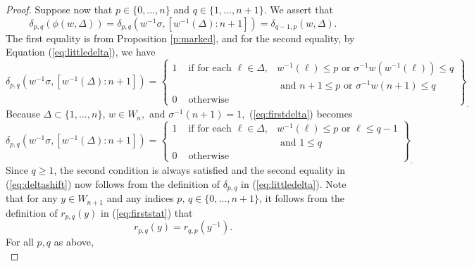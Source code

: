 \documentclass[10pt,a4paper]{amsart}
\newcommand{\Wn}{{W}_n}
\newcommand{\cW}{{ W}}
\begin{document}
\begin{proof}
Suppose now that $p\in\{0,\dots, n\}$ and $q\in\{1,\dots, n+1\}.$  We assert that 
\begin{equation} \label{eq:deltashift}
\delta_{p,q}(\phi(w,\Delta))=\delta_{p,q}(w^{-1}\sigma, [w^{-1}(\Delta): n+1])=\delta_{q-1, p}(w,\Delta).
\end{equation}
The first equality is from Proposition \ref{p:marked}, and for the second equality, by Equation (\ref{eq:littledelta}), we have 
\begin{equation}\label{eq:firstdelta}
\delta_{p,q}(w^{-1}\sigma, [w^{-1}(\Delta): n+1])=\left\{\begin{array}{ccc} 1 & \mbox { if for each } \ell\in\Delta, & w^{-1}(\ell)\leq p \mbox{ or } \sigma^{-1}w(w^{-1}(\ell))\leq q \\
&\;\;\;\;\;\;\;\;\;\;\;\;\;\;\;\;\;\;\;  & \mbox{ and } n+1\leq p\mbox{ or } \sigma^{-1}w(n+1)\leq q\\
0 &\mbox{ otherwise } & \end{array}\right\}_{.}
\end{equation}
Because $\Delta\subset\{1,\dots, n\}$, $w\in\Wn,$ and $\sigma^{-1}(n+1)=1,$  (\ref{eq:firstdelta}) becomes
\begin{equation}\label{eq:seconddelta}
\delta_{p,q}(w^{-1}\sigma, [w^{-1}(\Delta): n+1])=\left\{\begin{array}{ccc} 1 & \mbox { if for each } \ell\in\Delta, & w^{-1}(\ell)\leq p \mbox{ or } \ell\leq q-1 \\
&\;\;\;\;\;\;\;\;\;\;\;\;\;\;\;\;\;\;\;   & \mbox{ and } 1\leq q\;\;\;\;\;\;\;\;\;\;\;\;\;\;\;\;\;\;\;\;\;\;\;\;\;\\
0 &\mbox{ otherwise } & \end{array}\right\}_{.}
\end{equation}
Since $q\geq 1$, the second condition is always satisfied and the second equality in (\ref{eq:deltashift}) now follows from the definition of $\delta_{p,q}$ in (\ref{eq:littledelta}). 
Note that for any $y\in \cW_{n+1}$ and any indices $p,\, q\in \{0,\dots, n+1\}$, it follows from the definition of $r_{p,q}(y)$ in (\ref{eq:firststat}) 
 that 
\begin{equation}\label{eq:rpqinv}
r_{p,q}(y)=r_{q,p}(y^{-1}).
\end{equation}  
For all $p, q$ as above,  
\begin{equation*}

\end{equation*}
\end{proof}
\end{document}
